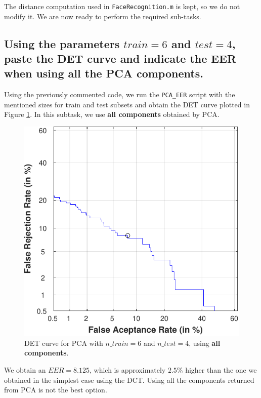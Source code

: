 \documentclass[a4paper]{article}
\def\inline{\lstinline[basicstyle=\ttfamily,keywordstyle={}]}
\begin{document}
The distance computation used in \inline{FaceRecognition.m} is kept, so we do not modify it. We are now ready to perform the required sub-tasks.

\subsection{ Using the parameters \(train = 6\) and \(test = 4\), paste the DET curve and indicate the EER when using all the PCA components.}


Using the previously commented code, we run the \inline{PCA_EER} script with the mentioned sizes for train and test subsets and obtain the DET curve plotted in Figure \ref{fig:ex2a}. In this subtask, we use \textbf{all components} obtained by PCA.

\begin{figure}[H]
  \centering
  \includegraphics[scale=0.7]{Figures/PCA-1-EER}
    \caption{DET curve for PCA with \(n\_train = 6\) and \(n\_test = 4\), using \textbf{all components}.}
    \label{fig:ex2a}
\end{figure}

We obtain an \(EER = 8.125\), which is approximately \(2.5 \%\) higher than the one we obtained in the simplest case using the DCT. Using all the components returned from PCA is not the best option.
\end{document}
